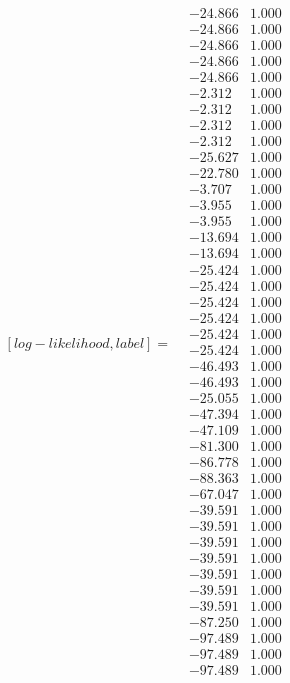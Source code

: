 \documentclass[conference]{IEEEtran}
\begin{document}
$$
[log-likelihood, label] =
 \begin{smallmatrix}
 &-24.866 &1.000\\
 &-24.866 &1.000\\
 &-24.866 &1.000\\
 &-24.866 &1.000\\
 &-24.866 &1.000\\
 &-2.312 &1.000\\
 &-2.312 &1.000\\
 &-2.312 &1.000\\
 &-2.312 &1.000\\
 &-25.627 &1.000\\
 &-22.780 &1.000\\
 &-3.707 &1.000\\
 &-3.955 &1.000\\
 &-3.955 &1.000\\
 &-13.694 &1.000\\
 &-13.694 &1.000\\
 &-25.424 &1.000\\
 &-25.424 &1.000\\
 &-25.424 &1.000\\
 &-25.424 &1.000\\
 &-25.424 &1.000\\
 &-25.424 &1.000\\
 &-46.493 &1.000\\
 &-46.493 &1.000\\
 &-25.055 &1.000\\
 &-47.394 &1.000\\
 &-47.109 &1.000\\
 &-81.300 &1.000\\
 &-86.778 &1.000\\
 &-88.363 &1.000\\
 &-67.047 &1.000\\
 &-39.591 &1.000\\
 &-39.591 &1.000\\
 &-39.591 &1.000\\
 &-39.591 &1.000\\
 &-39.591 &1.000\\
 &-39.591 &1.000\\
 &-39.591 &1.000\\
 &-87.250 &1.000\\
 &-97.489 &1.000\\
 &-97.489 &1.000\\
 &-97.489 &1.000\\

\end{smallmatrix}$$
\end{document}
